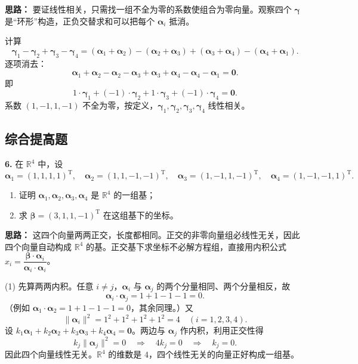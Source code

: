 \ifshowsolutions%
\quad
\textbf{思路：} 要证线性相关，只需找一组不全为零的系数使组合为零向量。观察四个 $\boldsymbol{\gamma}$ 是“环形”构造，正负交替求和可以把每个 $\boldsymbol{\alpha}_i$ 抵消。

计算
\[
\boldsymbol{\gamma}_1-\boldsymbol{\gamma}_2+\boldsymbol{\gamma}_3-\boldsymbol{\gamma}_4
=(\boldsymbol{\alpha}_1+\boldsymbol{\alpha}_2)-(\boldsymbol{\alpha}_2+\boldsymbol{\alpha}_3)
+(\boldsymbol{\alpha}_3+\boldsymbol{\alpha}_4)-(\boldsymbol{\alpha}_4+\boldsymbol{\alpha}_1).
\]
逐项消去：
\[
\boldsymbol{\alpha}_1+\boldsymbol{\alpha}_2-\boldsymbol{\alpha}_2-\boldsymbol{\alpha}_3
+\boldsymbol{\alpha}_3+\boldsymbol{\alpha}_4-\boldsymbol{\alpha}_4-\boldsymbol{\alpha}_1=\boldsymbol{0}.
\]
即
\[
1\cdot\boldsymbol{\gamma}_1+(-1)\cdot\boldsymbol{\gamma}_2+1\cdot\boldsymbol{\gamma}_3+(-1)\cdot\boldsymbol{\gamma}_4=\boldsymbol{0}.
\]
系数 $(1,-1,1,-1)$ 不全为零，按定义，$\boldsymbol{\gamma}_1,\boldsymbol{\gamma}_2,\boldsymbol{\gamma}_3,\boldsymbol{\gamma}_4$ 线性相关。

\else \answerarea[6] \fi%

\subsection{综合提高题}

\textbf{6.} 在 $\mathbb{R}^4$ 中，设
\[
\boldsymbol{\alpha}_1=(1,1,1,1)^\mathrm{T},\quad
\boldsymbol{\alpha}_2=(1,1,-1,-1)^\mathrm{T},\quad
\boldsymbol{\alpha}_3=(1,-1,1,-1)^\mathrm{T},\quad
\boldsymbol{\alpha}_4=(1,-1,-1,1)^\mathrm{T}.
\]
\begin{enumerate}[label=(\arabic*)]
    \item 证明 $\boldsymbol{\alpha}_1,\boldsymbol{\alpha}_2,\boldsymbol{\alpha}_3,\boldsymbol{\alpha}_4$ 是 $\mathbb{R}^4$ 的一组基；
    \item 求 $\boldsymbol{\beta}=(3,1,1,-1)^\mathrm{T}$ 在这组基下的坐标。
\end{enumerate}

\ifshowsolutions%
\quad
\textbf{思路：} 这四个向量两两正交，长度都相同。正交的非零向量组必线性无关，因此四个向量自动构成 $\mathbb{R}^4$ 的基。正交基下求坐标不必解方程组，直接用内积公式 $x_i=\dfrac{\boldsymbol{\beta}\cdot\boldsymbol{\alpha}_i}{\boldsymbol{\alpha}_i\cdot\boldsymbol{\alpha}_i}$。

(1) 先算两两内积。任意 $i\neq j$，$\boldsymbol{\alpha}_i$ 与 $\boldsymbol{\alpha}_j$ 的两个分量相同、两个分量相反，故
\[
\boldsymbol{\alpha}_i\cdot\boldsymbol{\alpha}_j=1+1-1-1=0.
\]
（例如 $\boldsymbol{\alpha}_1\cdot\boldsymbol{\alpha}_2=1+1-1-1=0$，其余同理。）又
\[
\|\boldsymbol{\alpha}_i\|^2=1^2+1^2+1^2+1^2=4\quad(i=1,2,3,4).
\]
设 $k_1\boldsymbol{\alpha}_1+k_2\boldsymbol{\alpha}_2+k_3\boldsymbol{\alpha}_3+k_4\boldsymbol{\alpha}_4=\boldsymbol{0}$。两边与 $\boldsymbol{\alpha}_j$ 作内积，利用正交性得
\[
k_j\|\boldsymbol{\alpha}_j\|^2=0\quad\Longrightarrow\quad 4k_j=0\quad\Longrightarrow\quad k_j=0.
\]
因此四个向量线性无关。$\mathbb{R}^4$ 的维数是 $4$，四个线性无关的向量正好构成一组基。

